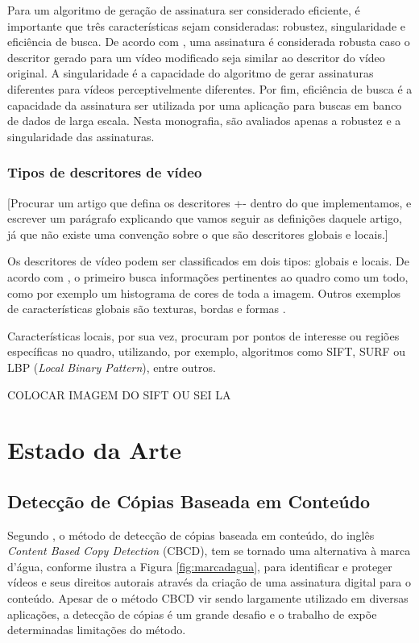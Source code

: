       Para um algoritmo de geração de assinatura ser considerado eficiente, é importante que três características sejam consideradas: robustez, singularidade e eficiência de busca. De acordo com \citeauthor{lee2008robust}, uma assinatura é considerada robusta caso o descritor gerado para um vídeo modificado seja similar ao descritor do vídeo original. A singularidade é a capacidade do algoritmo de gerar assinaturas diferentes para vídeos perceptivelmente diferentes. Por fim, eficiência de busca é a capacidade da assinatura  ser utilizada por uma aplicação para buscas em banco de dados de larga escala. Nesta monografia, são avaliados apenas a robustez e a singularidade das assinaturas.
        
        \subsection{Tipos de descritores de vídeo}
        
        [Procurar um artigo que defina os descritores +- dentro do que implementamos, e escrever um parágrafo explicando que vamos seguir as definições daquele artigo, já que não existe uma convenção sobre o que são descritores globais e locais.]


	Os descritores de vídeo podem ser classificados em dois tipos: globais e locais. De acordo com \citeauthor{de2012combinaccao}, o primeiro busca informações pertinentes ao quadro como um todo, como por exemplo um histograma de cores de toda a imagem. Outros exemplos de características globais são texturas, bordas e formas  \citeauthor{law2007video}.
       
    Características locais, por sua vez, procuram por pontos de interesse ou regiões específicas no quadro, utilizando, por exemplo, algoritmos como SIFT, SURF ou LBP (\textit{Local Binary Pattern}), entre outros.      
    
    COLOCAR IMAGEM DO SIFT OU SEI LA

\chapter{Estado da Arte}
\label{chap:estadodaarte}

     \section{Detecção de Cópias Baseada em Conteúdo} 
	Segundo \citeauthor{jiang2011pku}, o método de detecção de cópias baseada em conteúdo, do inglês \textit{Content Based Copy Detection} (CBCD), tem se tornado uma alternativa à marca d'água, conforme ilustra a Figura \ref{fig:marcadagua}, para identificar e proteger vídeos e seus direitos autorais através da criação de uma assinatura digital para o conteúdo. Apesar de o método CBCD vir sendo largamente utilizado em diversas aplicações, a detecção de cópias é um grande desafio e o trabalho de \citeauthor{jiang2011pku} expõe determinadas limitações do método.
    
